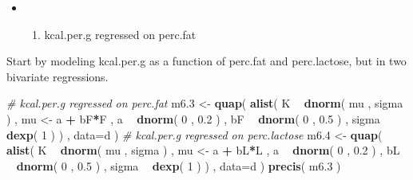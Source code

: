 \documentclass[
]{article}
\newenvironment{Shaded}{\begin{snugshade}}{\end{snugshade}}
\newcommand{\CommentTok}[1]{\textcolor[rgb]{0.56,0.35,0.01}{\textit{#1}}}
\newcommand{\DataTypeTok}[1]{\textcolor[rgb]{0.13,0.29,0.53}{#1}}
\newcommand{\DecValTok}[1]{\textcolor[rgb]{0.00,0.00,0.81}{#1}}
\newcommand{\FloatTok}[1]{\textcolor[rgb]{0.00,0.00,0.81}{#1}}
\newcommand{\KeywordTok}[1]{\textcolor[rgb]{0.13,0.29,0.53}{\textbf{#1}}}
\newcommand{\NormalTok}[1]{#1}
\newcommand{\OperatorTok}[1]{\textcolor[rgb]{0.81,0.36,0.00}{\textbf{#1}}}
\newcommand{\StringTok}[1]{\textcolor[rgb]{0.31,0.60,0.02}{#1}}
\providecommand{\tightlist}{%
  \setlength{\itemsep}{0pt}\setlength{\parskip}{0pt}}
\begin{document}
\begin{Shaded}
\end{Shaded}

\begin{itemize}
\item
  \begin{enumerate}
  \def\labelenumi{\arabic{enumi}.}
  \tightlist
  \item
    kcal.per.g regressed on perc.fat
  \end{enumerate}
\end{itemize}

Start by modeling kcal.per.g as a function of perc.fat and perc.lactose,
but in two bivariate regressions.

\begin{Shaded}
\begin{Highlighting}[]
\CommentTok{# kcal.per.g regressed on perc.fat}
\NormalTok{m6}\FloatTok{.3}\NormalTok{ <-}\StringTok{ }\KeywordTok{quap}\NormalTok{(}
    \KeywordTok{alist}\NormalTok{(}
\NormalTok{        K }\OperatorTok{~}\StringTok{ }\KeywordTok{dnorm}\NormalTok{( mu , sigma ) ,}
\NormalTok{        mu <-}\StringTok{ }\NormalTok{a }\OperatorTok{+}\StringTok{ }\NormalTok{bF}\OperatorTok{*}\NormalTok{F ,}
\NormalTok{        a }\OperatorTok{~}\StringTok{ }\KeywordTok{dnorm}\NormalTok{( }\DecValTok{0}\NormalTok{ , }\FloatTok{0.2}\NormalTok{ ) ,}
\NormalTok{        bF }\OperatorTok{~}\StringTok{ }\KeywordTok{dnorm}\NormalTok{( }\DecValTok{0}\NormalTok{ , }\FloatTok{0.5}\NormalTok{ ) ,}
\NormalTok{        sigma }\OperatorTok{~}\StringTok{ }\KeywordTok{dexp}\NormalTok{( }\DecValTok{1}\NormalTok{ )}
\NormalTok{) , }\DataTypeTok{data=}\NormalTok{d )}
\CommentTok{# kcal.per.g regressed on perc.lactose}
\NormalTok{m6}\FloatTok{.4}\NormalTok{ <-}\StringTok{ }\KeywordTok{quap}\NormalTok{(}
    \KeywordTok{alist}\NormalTok{(}
\NormalTok{        K }\OperatorTok{~}\StringTok{ }\KeywordTok{dnorm}\NormalTok{( mu , sigma ) ,}
\NormalTok{        mu <-}\StringTok{ }\NormalTok{a }\OperatorTok{+}\StringTok{ }\NormalTok{bL}\OperatorTok{*}\NormalTok{L ,}
\NormalTok{        a }\OperatorTok{~}\StringTok{ }\KeywordTok{dnorm}\NormalTok{( }\DecValTok{0}\NormalTok{ , }\FloatTok{0.2}\NormalTok{ ) ,}
\NormalTok{        bL }\OperatorTok{~}\StringTok{ }\KeywordTok{dnorm}\NormalTok{( }\DecValTok{0}\NormalTok{ , }\FloatTok{0.5}\NormalTok{ ) ,}
\NormalTok{        sigma }\OperatorTok{~}\StringTok{ }\KeywordTok{dexp}\NormalTok{( }\DecValTok{1}\NormalTok{ )}
\NormalTok{) , }\DataTypeTok{data=}\NormalTok{d )}
\KeywordTok{precis}\NormalTok{( m6}\FloatTok{.3}\NormalTok{ )}
\end{Highlighting}
\end{Shaded}
\end{document}

